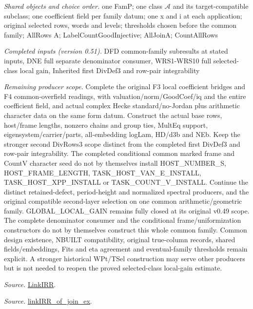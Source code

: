 \documentclass[11pt,a4paper]{article}
\numberwithin{equation}{section}
\theoremstyle{remark}\newtheorem{remark}[theorem]{Remark}
\begin{document}
\emph{Shared objects and choice order.} one FamP; one class $\mathcal A$ and its target-compatible subclass; one coefficient field per family datum; one x and i at each application; original selected rows, words and levels; thresholds chosen before the common family; AllRows A; LabelCountGoodInjective; AllJoinA; CountAllRows

\emph{Completed inputs (version 0.51).} DFD common-family subresults at stated inputs, DNE full separate denominator consumer, WRS1-WRS10 full selected-class local gain, Inherited first DivDef3 and row-pair integrability

\emph{Remaining producer scope.} Complete the original F3 local coefficient bridges and F4 common-overfield readings, with valuation/norm/GoodCoef/iq and the entire coefficient field, and actual complex Hecke standard/no-Jordan plus arithmetic character data on the same form datum. Construct the actual base rows, host/frame lengths, nonzero chains and group ties, MultEq support, eigensystem/carrier/parts, all-embedding logLam, HD/d3b and NEb. Keep the stronger second DivRows3 scope distinct from the completed first DivDef3 and row-pair integrability. The completed conditional common marked frame and CountV character seed do not by themselves install HOST\_\allowbreak NUMBER\_\allowbreak S, HOST\_\allowbreak FRAME\_\allowbreak LENGTH, TASK\_\allowbreak HOST\_\allowbreak VAN\_\allowbreak E\_\allowbreak INSTALL, TASK\_\allowbreak HOST\_\allowbreak XPP\_\allowbreak INSTALL or TASK\_\allowbreak COUNT\_\allowbreak V\_\allowbreak INSTALL. Continue the distinct retained-defect, period-height and normalized spectral producers, and the original compatible second-layer selection on one common arithmetic/geometric family. GLOBAL\_\allowbreak LOCAL\_\allowbreak GAIN remains fully closed at its original v0.49 scope. The complete denominator consumer and the conditional frame/uniformization constructors do not by themselves construct this whole common family. Common design existence, NBUILT compatibility, original true-column records, shared fields/embeddings, Fits and eta agreement and eventual-family thresholds remain explicit. A stronger historical WPt/TSel construction may serve other producers but is not needed to reopen the proved selected-class local-gain estimate.

\emph{Source.} \href{https://github.com/CocoSgt/riemann-hypothesis-lean/blob/7cbf7a0c32fca1badf05931879a37c3f8a2b03b4/src/Formalism/SharpRestriction/GlobalTheoremInputs.lean#L55-L58}{LinkIRR}.

\emph{Source.} \href{https://github.com/CocoSgt/riemann-hypothesis-lean/blob/7cbf7a0c32fca1badf05931879a37c3f8a2b03b4/src/Development/AbelianVarietyTheory/Proofs/GlobalInterpolation/LinkIRROfJoinEx.lean#L17-L38}{linkIRR\_\allowbreak of\_\allowbreak join\_\allowbreak ex}.
\end{document}
